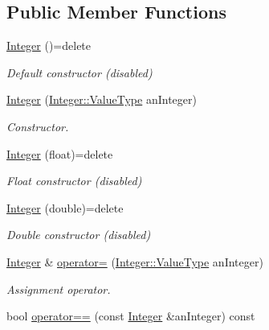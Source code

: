 \subsection*{Public Member Functions}
\begin{DoxyCompactItemize}
\item 
\hyperlink{classlibrary_1_1core_1_1types_1_1_integer_a6483b1c4e13e5ed6af5e7a58347efead}{Integer} ()=delete
\begin{DoxyCompactList}\small\item\em Default constructor (disabled) \end{DoxyCompactList}\item 
\hyperlink{classlibrary_1_1core_1_1types_1_1_integer_ac282b8e24c1d1a43e578c5be3c70ea27}{Integer} (\hyperlink{classlibrary_1_1core_1_1types_1_1_integer_a623afb1580f870fd8a1997b1c12c917d}{Integer\+::\+Value\+Type} an\+Integer)
\begin{DoxyCompactList}\small\item\em Constructor. \end{DoxyCompactList}\item 
\hyperlink{classlibrary_1_1core_1_1types_1_1_integer_af3bcebe374c4b7b4329ed0a7fae04abd}{Integer} (float)=delete
\begin{DoxyCompactList}\small\item\em Float constructor (disabled) \end{DoxyCompactList}\item 
\hyperlink{classlibrary_1_1core_1_1types_1_1_integer_ab0d94d5cfc78f38f1598679015f4ab61}{Integer} (double)=delete
\begin{DoxyCompactList}\small\item\em Double constructor (disabled) \end{DoxyCompactList}\item 
\hyperlink{classlibrary_1_1core_1_1types_1_1_integer}{Integer} \& \hyperlink{classlibrary_1_1core_1_1types_1_1_integer_ab77cae94a9e6d4a405a555dd55763ea2}{operator=} (\hyperlink{classlibrary_1_1core_1_1types_1_1_integer_a623afb1580f870fd8a1997b1c12c917d}{Integer\+::\+Value\+Type} an\+Integer)
\begin{DoxyCompactList}\small\item\em Assignment operator. \end{DoxyCompactList}\item 
bool \hyperlink{classlibrary_1_1core_1_1types_1_1_integer_a52b3a012d6c6779773d051800daac516}{operator==} (const \hyperlink{classlibrary_1_1core_1_1types_1_1_integer}{Integer} \&an\+Integer) const

\end{DoxyCompactItemize}
